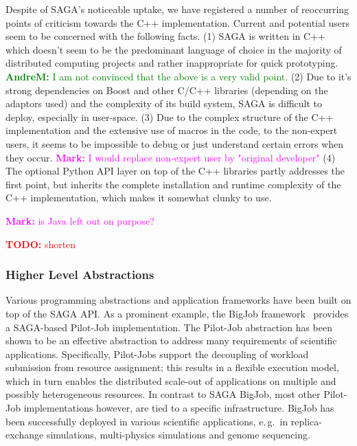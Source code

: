 \documentclass{article}
\newcommand{\B}[1]{\textbf{#1}}
\newcommand{\todo}[1]{{\textcolor{red}{\B{TODO:} #1 }}}
\newcommand{\amnote}[1]{{\textcolor{green}{   \B{AndreM:  } #1 }}}
\newcommand{\msnote}[1]{{\textcolor{magenta}{ \B{Mark:    } #1 }}}
\newcommand{\amnote}[1]{}
\newcommand{\msnote}[1]{}
\begin{document}
  Despite of SAGA's noticeable uptake, we have registered a number of
  reoccurring points of criticism towards the C++ implementation.
  Current and potential users seem to be concerned with the following
  facts. 
  (1) SAGA is written in C++ which doesn't seem to be the predominant
  language of choice in the majority of distributed computing projects
  and rather inappropriate for quick prototyping.  \amnote{I am not
  convinced that the above is a very valid point.}
  (2) Due to it's strong dependencies on Boost and other C/C++
  libraries (depending on the adaptors used) and the complexity of its
  build system, SAGA is difficult to deploy, especially in user-space.
  (3) Due to the complex structure of the C++ implementation and the
  extensive use of macros in the code, to the non-expert users, it
  seems to be impossible to debug or just understand certain errors
  when they occur.
  \msnote{I would replace non-expert user by "original developer"}
  (4) The optional Python API layer on top of the C++ libraries partly
  addresses the first point, but inherits the complete installation
  and runtime complexity of the C++ implementation, which makes it
  somewhat clunky to use.

\msnote{is Java left out on purpose?}

  \todo{shorten}


 \subsubsection{Higher Level Abstractions}

  Various programming abstractions and application frameworks have
  been built on top of the SAGA API.  As a prominent example, the
  BigJob framework~\cite{saga_bigjob_condor_cloud}  provides
  a SAGA-based Pilot-Job implementation. The Pilot-Job abstraction has
  been shown to be an effective abstraction to address many
  requirements of scientific applications.  Specifically, Pilot-Jobs
  support the decoupling of workload submission from resource
  assignment; this results in a flexible execution model, which in
  turn enables the distributed scale-out of applications on multiple
  and possibly heterogeneous resources. In contrast to SAGA BigJob,
  most other Pilot-Job implementations however, are tied to a specific
  infrastructure. BigJob has been successfully deployed in various
  scientific applications, e.\,g.\ in replica-exchange simulations,
  multi-physics simulations and genome sequencing.
\end{document}
